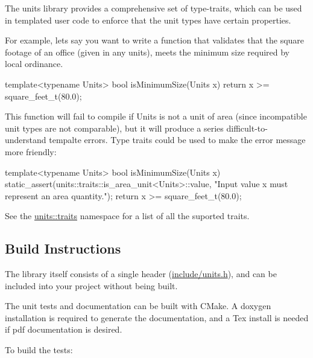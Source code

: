 The units library provides a comprehensive set of type-\/traits, which can be used in templated user code to enforce that the unit types have certain properties.

For example, let\textquotesingle{}s say you want to write a function that validates that the square footage of an office (given in any units), meets the minimum size required by local ordinance. \begin{DoxyVerb}template<typename Units>
bool isMinimumSize(Units x)
{
    return x >= square_feet_t(80.0);
}
\end{DoxyVerb}


This function will fail to compile if {\ttfamily Units} is not a unit of area (since incompatible unit types are not comparable), but it will produce a series difficult-\/to-\/understand tempalte errors. Type traits could be used to make the error message more friendly\+: \begin{DoxyVerb}template<typename Units>
bool isMinimumSize(Units x)
{
    static_assert(units::traits::is_area_unit<Units>::value, "Input value x must represent an area quantity.");
    return x >= square_feet_t(80.0);
}
\end{DoxyVerb}


See the {\ttfamily \hyperlink{namespaceunits_1_1traits}{units\+::traits}} namespace for a list of all the suported traits.

\subsection*{Build Instructions }

The library itself consists of a single header (\hyperlink{units_8h}{include/units.\+h}), and can be included into your project without being built.

The unit tests and documentation can be built with C\+Make. A doxygen installation is required to generate the documentation, and a Tex install is needed if pdf documentation is desired.

To build the tests\+:

